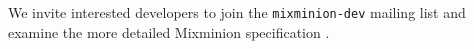 \documentclass[11pt]{IEEEtran}
\begin{document}
We invite interested developers to join the {\tt mixminion-dev}
mailing list and examine the more detailed Mixminion
specification \cite{mixminion-spec}.







\end{document}
